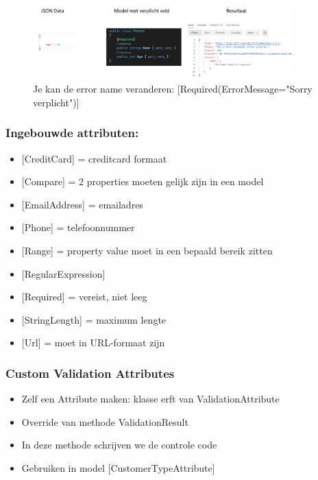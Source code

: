 \documentclass{article}
\begin{document}
\begin{figure}[H]
    \centering
    \includegraphics[width=0.9\textwidth]{validation-attributes-json.png}
    \caption{Je kan de error name veranderen: [Required(ErrorMessage="Sorry verplicht")]}
\end{figure}

\subsubsection{Ingebouwde attributen:}

\begin{itemize}
    \item {[CreditCard]} = creditcard formaat
    \item {[Compare]} = 2 properties moeten gelijk zijn in een model 
    \item {[EmailAddress]} = emailadres
    \item {[Phone]} = telefoonnummer
    \item {[Range]} = property value moet in een bepaald bereik zitten
    \item {[RegularExpression]}
    \item {[Required]} = vereist, niet leeg
    \item {[StringLength]} = maximum lengte
    \item {[Url]} = moet in URL-formaat zijn
\end{itemize}

\subsubsection{Custom Validation Attributes}

\begin{itemize}
    \item Zelf een Attribute maken: klasse erft van ValidationAttribute
    \item Override van methode ValidationResult
    \item In deze methode schrijven we de controle code
    \item Gebruiken in model [CustomerTypeAttribute]
\end{itemize}
\end{document}
